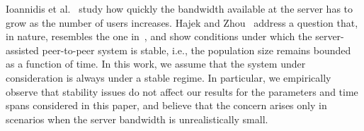 {%


Ioannidis et al.~\cite{ioannidis} study how quickly the bandwidth available at the server has to grow as the number of users increases.  Hajek and Zhou~\cite{hajek} address  a question that, in nature, resembles the one in~\cite{ioannidis}, and show conditions under which the server-assisted peer-to-peer system is stable, i.e., the population size remains bounded as a function of time.  In this work, we assume that the system under consideration is always under a stable regime.   In particular, we empirically observe that stability issues do not affect our results for the parameters and time spans considered in this paper, and believe that the concern arises only in scenarios when the server bandwidth is unrealistically small.


}
